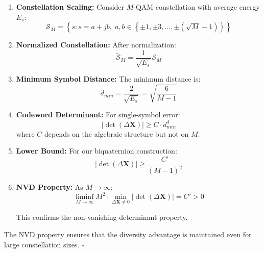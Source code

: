 \begin{enumerate}
    \item \textbf{Constellation Scaling:} Consider $M$-QAM constellation with average energy $E_s$:
    \begin{equation}
    \mathcal{S}_M = \left\{s : s = a + jb, \; a,b \in \left\{\pm 1, \pm 3, \ldots, \pm(\sqrt{M}-1)\right\}\right\}
    \end{equation}
    
    \item \textbf{Normalized Constellation:} After normalization:
    \begin{equation}
    \tilde{\mathcal{S}}_M = \frac{1}{\sqrt{E_s}} \mathcal{S}_M
    \end{equation}
    
    \item \textbf{Minimum Symbol Distance:} The minimum distance is:
    \begin{equation}
    d_{min} = \frac{2}{\sqrt{E_s}} = \sqrt{\frac{6}{M-1}}
    \end{equation}
    
    \item \textbf{Codeword Determinant:} For single-symbol error:
    \begin{equation}
    |\det(\Delta\mathbf{X})| \geq C \cdot d_{min}^4
    \end{equation}
    where $C$ depends on the algebraic structure but not on $M$.
    
    \item \textbf{Lower Bound:} For our biquaternion construction:
    \begin{equation}
    |\det(\Delta\mathbf{X})| \geq \frac{C'}{(M-1)^2}
    \end{equation}
    
    \item \textbf{NVD Property:} As $M \to \infty$:
    \begin{equation}
    \liminf_{M \to \infty} M^2 \cdot \min_{\Delta\mathbf{X} \neq 0} |\det(\Delta\mathbf{X})| = C' > 0
    \end{equation}
    
    This confirms the non-vanishing determinant property.
\end{enumerate}

The NVD property ensures that the diversity advantage is maintained even for large constellation sizes. $\square$
